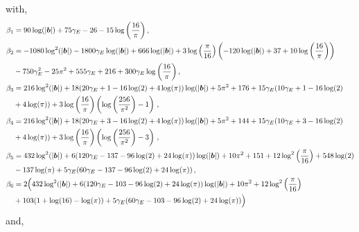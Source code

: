 with,
\begin{align}
    \begin{split}
       & \beta_1=90 \log (|\boldsymbol{b}|)+75 \gamma_E -26-15 \log \left(\frac{16}{\pi }\right),\\ &
       \beta_2=-1080 \log ^2(|\boldsymbol{b}|)-1800 \gamma_E  \log (|\boldsymbol{b}|)+666 \log (|\boldsymbol{b}|)+3 \log \left(\frac{\pi }{16}\right) \left(-120 \log (|\boldsymbol{b}|)+37+10 \log \left(\frac{16}{\pi }\right)\right)\\ &\hspace{0.35cm}-750 \gamma_E ^2-25 \pi ^2+555 \gamma_E +216+300 \gamma_E  \log \left(\frac{16}{\pi }\right),\\ &
       \beta_3=216 \log ^2(|\boldsymbol{b}|)+18 (20 \gamma_E +1-16 \log (2)+4 \log (\pi )) \log (|\boldsymbol{b}|)+5 \pi ^2+176+15 \gamma_E  (10 \gamma_E +1-16 \log (2)\\ &\hspace{0.35cm}+4 \log (\pi ))+3 \log \left(\frac{16}{\pi }\right) \left(\log \left(\frac{256}{\pi ^2}\right)-1\right)\,,\\ &
       \beta_4=216 \log ^2(|\boldsymbol{b}|)+18 (20 \gamma_E +3-16 \log (2)+4 \log (\pi )) \log (|\boldsymbol{b}|)+5 \pi ^2+144+15 \gamma_E  (10 \gamma_E +3-16 \log (2)\\ &\hspace{0.35cm}+4 \log (\pi ))+3 \log \left(\frac{16}{\pi }\right) \left(\log \left(\frac{256}{\pi ^2}\right)-3\right)\,,\\ &
       \beta_5=432 \log ^2(|\boldsymbol{b}|)+6 (120 \gamma_E -137-96 \log (2)+24 \log (\pi )) \log (|\boldsymbol{b}|)+10 \pi ^2+151+12 \log ^2\left(\frac{\pi }{16}\right)+548 \log (2)\\ &\hspace{0.35cm}-137 \log (\pi )+5 \gamma_E  (60 \gamma_E -137-96 \log (2)+24 \log (\pi ))\,,\\ &
       \beta_6=2 \Big(432 \log ^2(|\boldsymbol{b}|)+6 (120 \gamma_E -103-96 \log (2)+24 \log (\pi )) \log (|\boldsymbol{b}|)+10 \pi ^2+12 \log ^2\left(\frac{\pi }{16}\right)\\ &\hspace{0.35cm}+103 (1+\log (16)-\log (\pi ))+5 \gamma_E  (60 \gamma_E -103-96 \log (2)+24 \log (\pi ))\Big)
    \end{split}
\end{align}
and,
